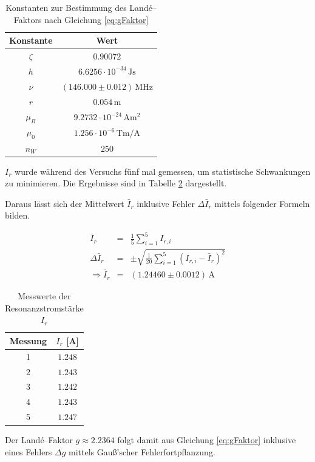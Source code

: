 \documentclass[12pt,a4paper]{scrartcl}
\numberwithin{equation}{section} %
\begin{document}
\begin{table}[h!]
	\centering
	\begin{tabular}{c|c}
		Konstante & Wert \\
		\hline
		$\zeta$ & $0.90072$ \\
		$h$ & $6.6256 \cdot 10^{-34} \mathrm{\, Js}$ \\
		$\nu$ & $(146.000 \pm 0.012) \mathrm{\, MHz} $ \\
		$r$ & $0.054 \mathrm{\, m}$ \\
		$\mu_B$ & $9.2732 \cdot 10^{-24} \mathrm{\, Am^2}$ \\
		$\mu_0$ & $1.256 \cdot 10^{-6} \mathrm{\, Tm/A}$ \\
		$n_W$ & $250$ \\
	\end{tabular}
	\caption{Konstanten zur Bestimmung des Landé--Faktors nach Gleichung \eqref{eq:gFaktor}}
	\label{table:konstanten}
\end{table}

\noindent
$I_r$ wurde während des Versuchs fünf mal gemessen, um statistische Schwankungen zu minimieren. Die Ergebnisse sind in Tabelle \ref{table:I_r} dargestellt.

Daraus lässt sich der Mittelwert $\bar{I}_r$ inklusive Fehler $\Delta \bar{I}_r$ mittels folgender Formeln bilden.

\begin{eqnarray}
	\bar{I}_r &=& \frac{1}{5} \sum_{i=1}^{5} I_{r,i} \\
	\Delta \bar{I}_r &=& \pm\sqrt{\frac{1}{20} \sum_{i=1}^{5} (I_{r,i} - \bar{I}_r)^2} \\
	\Rightarrow \bar I_r &=& (1.24460 \pm 0.0012) \mathrm{\, A}
\end{eqnarray}

\begin{table}[h!]
	\centering
	\begin{tabular}{c|c}
		Messung & $I_r$ [A] \\
		\hline
		1 & $1.248$ \\
		2 & $1.243$ \\
		3 & $1.242$ \\
		4 & $1.243$ \\
		5 & $1.247$ \\
	\end{tabular}
	\caption{Messwerte der Resonanzstromstärke $I_r$}
	\label{table:I_r}
\end{table}

\noindent
Der Landé--Faktor $g\approx 2.2364$ folgt damit aus Gleichung \eqref{eq:gFaktor} inklusive eines Fehlers $\Delta g$ mittels Gauß'scher Fehlerfortpflanzung.
\end{document}
